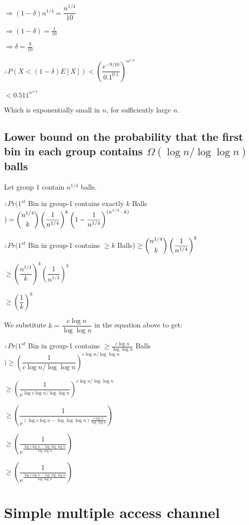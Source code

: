 \documentclass{article}
\begin{document}
$\Rightarrow (1-\delta)n^{1/4} = \dfrac{n^{1/4}}{10}$

$\Rightarrow (1-\delta) = \frac{1}{10}$

$\Rightarrow \delta = \frac{9}{10}$

$\therefore P(X < (1-\delta)E[X]) < \left(\dfrac{e^{-9/10}}{0.1^{0.1}}\right)^{n^{1/4}}$

$< 0.511^{n^{1/4}}$

Which is exponentially small in $n$, for sufficiently large $n$.


\subsection{Lower bound on the probability that the first bin in each group contains $\Omega(\log{n}/\log{\log{n}})$ balls}

Let group 1 contain $n^{1/4}$ balls.

$\therefore Pr(1^{st}$ Bin in group-1 contains exactly $k$ Balls$) = \dbinom{n^{1/4}}{k} \left( \dfrac{1}{n^{1/4}} \right)^{k} \left( 1 - \dfrac{1}{n^{1/4}} \right)^{(n^{1/4} - k)}$

$\therefore Pr(1^{st}$ Bin in group-1 contains $\ge k$ Balls$) \ge \dbinom{n^{1/4}}{k} \left( \dfrac{1}{n^{1/4}} \right)^{k}$

$\ge \left(\dfrac{n^{1/4}}{k}\right)^{k} \left( \dfrac{1}{n^{1/4}} \right)^{k}$

$\ge \left(\dfrac{1}{k}\right)^{k}$

We substitute $k = \dfrac{c\log{n}}{\log{\log{n}}}$ in the equation above to get:

$\therefore Pr(1^{st}$ Bin in group-1 contains $\ge \frac{c\log{n}}{\log{\log{n}}}$ Balls$) \ge \left(\dfrac{1}{c\log{n}/\log{\log{n}}}\right)^{c\log{n}/\log{\log{n}}}$

$\ge \left(\dfrac{1}{{e}^{\log{c\log{n}/\log{\log{n}}}}}\right)^{c\log{n}/\log{\log{n}}}$

$\ge \left(\dfrac{1}{{e}^{(\log{c\log{n}} - \log{\log{\log{n}}})\frac{c\log{n}}{\log{\log{n}}}}} \right)$

$\ge \left(\dfrac{1}{{e}^{\frac{\log{c\log{n}} - \log{\log{\log{n}}}}{\log{\log{n}}}}} \right)$

$\ge \left(\dfrac{1}{{e}^{\frac{\log{c\log{n}} - \log{\log{\log{n}}}}{\log{\log{n}}}}} \right)$

\clearpage

\section {Simple multiple access channel}
\end{document}
